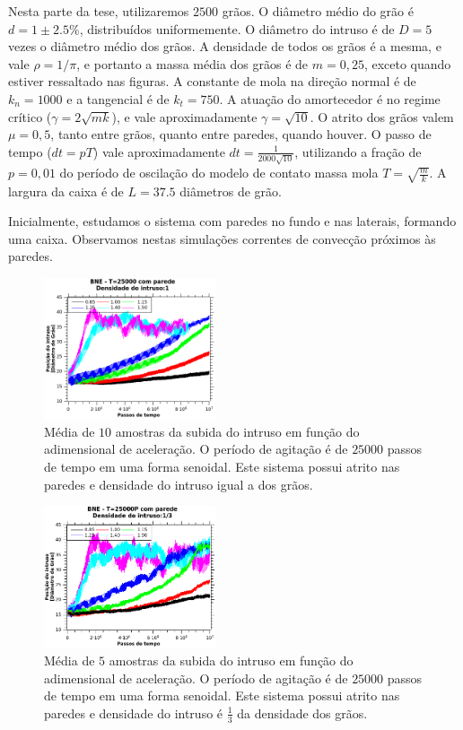     Nesta parte da tese, utilizaremos $2500$ grãos. O diâmetro médio do grão é $d = 1\pm 2.5\%$, distribuídos uniformemente. O diâmetro do intruso é de $D = 5$ vezes o diâmetro médio dos grãos. A densidade de todos os grãos é a mesma, e vale $\rho = 1/\pi$, e portanto a massa média dos grãos é de $m = 0,25$, exceto quando estiver ressaltado nas figuras. A constante de mola na direção normal é de $k_{n} = 1000$ e a tangencial é de $k_{t} = 750$. A atuação do amortecedor é no regime crítico ($\gamma = 2\sqrt{m k}$), e vale aproximadamente $\gamma = \sqrt{10}$. O atrito dos grãos valem $\mu = 0,5$, tanto entre grãos, quanto entre paredes, quando houver. O passo de tempo ($dt=pT$) vale aproximadamente $dt = \frac{1}{2000\sqrt{10}}$, utilizando a fração de $p=0,01$ do período de oscilação do modelo de contato massa mola $T = \sqrt{\frac{m}{k}}$. A largura da caixa é de $L = 37.5$ diâmetros de grão.

    Inicialmente, estudamos o sistema com paredes no fundo e nas laterais, formando uma caixa. Observamos nestas simulações correntes de convecção próximos às paredes.

\begin{figure}
    \centering
    \includegraphics[width=0.45\textwidth]{04-figuras/BNE25000D1.png}
    \caption{Média de $10$ amostras da subida do intruso em função do adimensional de aceleração. O período de agitação é de $25000$ passos de tempo em uma forma senoidal. Este sistema possui atrito nas paredes e densidade do intruso igual a dos grãos.}
    \label{fig:BNE25000_Parede}
\end{figure}

\begin{figure}
    \centering
    \includegraphics[width=0.45\textwidth]{04-figuras/BNE25000D1-3.png}
    \caption{Média de $5$ amostras da subida do intruso em função do adimensional de aceleração. O período de agitação é de $25000$ passos de tempo em uma forma senoidal. Este sistema possui atrito nas paredes e densidade do intruso é $\frac{1}{3}$ da densidade dos grãos.}
    \label{fig:BNE25000_Parede_Densidade1-3}
\end{figure}

